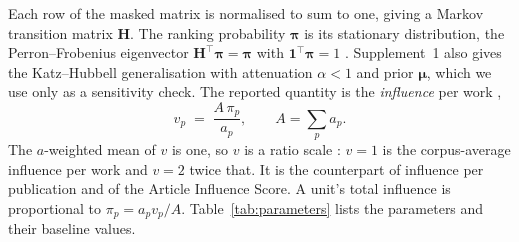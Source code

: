 Each row of the masked matrix is normalised to sum to one, giving a Markov transition matrix $\mathbf{H}$. The ranking probability $\boldsymbol{\pi}$ is its stationary distribution, the Perron--Frobenius eigenvector $\mathbf{H}^\top\boldsymbol{\pi}=\boldsymbol{\pi}$ with $\mathbf{1}^\top\boldsymbol{\pi}=1$ \citep{pinskiCitationInfluenceJournal1976, gellerCitationInfluenceMethodology1978}. Supplement~1 also gives the Katz--Hubbell generalisation with attenuation $\alpha<1$ and prior $\boldsymbol{\mu}$, which we use only as a sensitivity check. The reported quantity is the \emph{influence} per work \citep{palacios-huertaMeasurementIntellectualInfluence2004},
\begin{equation}
  v_p \;=\; \frac{A\,\pi_p}{a_p}, \qquad A=\sum_p a_p .
  \label{eq:vstar}
\end{equation}
The $a$-weighted mean of $v$ is one, so $v$ is a ratio scale \citep{stevensTheoryScalesMeasurement1946}: $v=1$ is the corpus-average influence per work and $v=2$ twice that. It is the counterpart of influence per publication \citep{pinskiCitationInfluenceJournal1976} and of the Article Influence Score. A unit's total influence is proportional to $\pi_p=a_p v_p/A$. Table~\ref{tab:parameters} lists the parameters and their baseline values.

